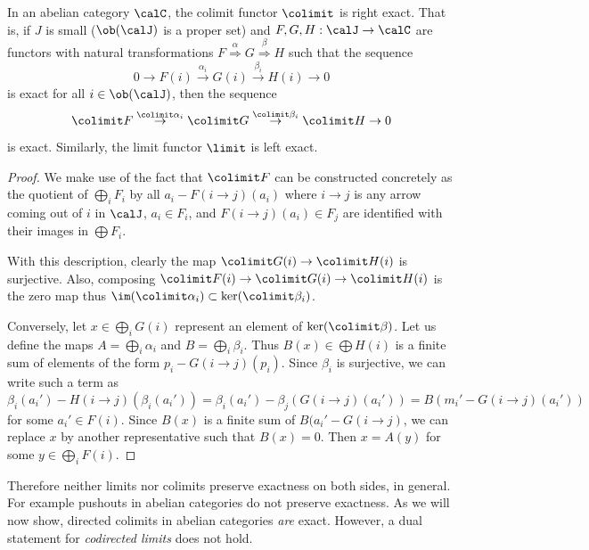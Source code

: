 \begin{prop}
    In an abelian category $\calC$, the colimit functor $\colimit$ is right exact. That is, if $J$ is small ($\ob(\calJ)$ is a proper set) and $F,G,H:\calJ\to \calC$ are functors with natural transformations $F\overset{\alpha}{\Longrightarrow}G\overset{\beta}{\Longrightarrow}H$ such that the sequence 
    \[0\to F(i)\overset{\alpha_i}{\to} G(i)\overset{\beta_i}{\to} H(i)\to 0\] is exact for all $i\in\ob(\calJ)$, then the sequence
    \[\colimit F\overset{\colimit \alpha_i}{\to}\colimit G\overset{\colimit \beta_i}{\to}\colimit H\to 0\]
    is exact. Similarly, the limit functor $\limit$ is left exact.
\end{prop}
\begin{proof}
    We make use of the fact that $\colimit F$ can be constructed concretely as the quotient of $\bigoplus_i F_i$ by all $a_i-F(i\to j)(a_i)$ where $i\to j$ is any arrow coming out of $i$ in $\calJ$, $a_i\in F_i$, and $F(i\to j)(a_i)\in F_j$ are identified with their images in $\bigoplus F_i$.

    With this description, clearly the map $\colimit G(i)\to \colimit H(i)$ is surjective. Also, composing $\colimit F(i)\to \colimit G(i)\to\colimit H(i)$ is the zero map thus $\im(\colimit \alpha_i)\subset \ker(\colimit \beta_i)$.

    Conversely, let $x\in \bigoplus_i G(i)$ represent an element of $\ker(\colimit \beta)$. Let us define the maps $A=\bigoplus_i \alpha_i$ and $B=\bigoplus_i \beta_i$. Thus $B(x)\in \bigoplus H(i)$ is a finite sum of elements of the form $p_i-G(i\to j)(p_i)$. Since $\beta_i$ is surjective, we can write such a term as 
    \[\beta_i(a_i')-H(i\to j)(\beta_i(a_i'))=\beta_i(a_i')-\beta_j(G(i\to j)(a_i'))=B(m_i'-G(i\to j)(a_i'))\]
    for some $a_i'\in F(i)$. Since $B(x)$ is a finite sum of $B(a_i'-G(i\to j)$, we can replace $x$ by another representative such that $B(x)=0$. Then $x=A(y)$ for some $y\in \bigoplus_i F(i)$.
\end{proof}

Therefore neither limits nor colimits preserve exactness on both sides, in general. For example pushouts in abelian categories do not preserve exactness. As we will now show, directed colimits in abelian categories \emph{are} exact. However, a dual statement for \emph{codirected limits} does not hold.

